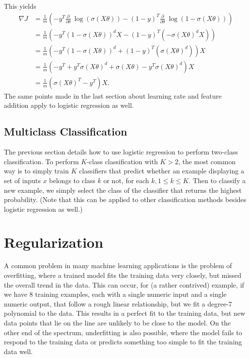\documentclass{article}
\begin{document}
This yields
\begin{align*}
\nabla J &= \frac{1}{m}\left(-y^T\frac{\partial}{\partial \theta}~ \log(\sigma(X\theta)) - (1-y)^T\frac{\partial}{\partial \theta}~\log(1-\sigma(X\theta))\right)\\
&= \frac{1}{m}\left(-y^T(1 - \sigma(X\theta))^dX - (1-y)^T(-\sigma(X\theta)^dX)\right)\\
&= \frac{1}{m}\left(-y^T(1 - \sigma(X\theta))^d + (1-y)^T(\sigma(X\theta)^d)\right)X\\
&= \frac{1}{m}\left(-y^T + y^T\sigma(X\theta)^d + \sigma(X\theta) - y^T\sigma(X\theta)^d\right)X\\
&= \frac{1}{m}(\sigma(X\theta)^T - y^T)X.
\end{align*}
The same points made in the last section about learning rate and feature addition apply to logistic regression as well.

\subsection{Multiclass Classification}
The previous section details how to use logistic regression to perform two-class classification. To perform $K$-class classification with $K>2$, the most common way is to simply train $K$ classifiers that predict whether an example displaying a set of inputs $x$ belongs to class $k$ or not, for each $k, 1 \le k \le K$. Then to classify a new example, we simply select the class of the classifier that returns the highest probability. (Note that this can be applied to other classification methods besides logistic regression as well.)

\section{Regularization}
A common problem in many machine learning applications is the problem of overfitting, where a trained model fits the training data very closely, but missed the overall trend in the data. This can occur, for (a rather contrived) example, if we have 8 training examples, each with a single numeric input and a single numeric output, that follow a rough linear relationship, but we fit a degree-7 polynomial to the data. This results in a perfect fit to the training data, but new data points that lie on the line are unlikely to be close to the model. On the other end of the spectrum, underfitting is also possible, where the model fails to respond to the training data or predicts something too simple to fit the training data well.
\end{document}
